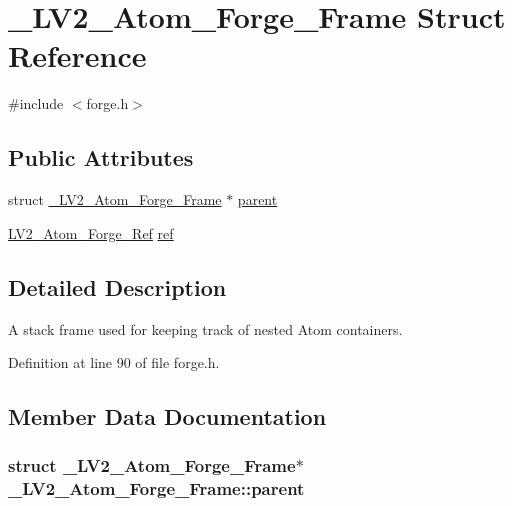 \hypertarget{struct___l_v2___atom___forge___frame}{}\section{\+\_\+\+L\+V2\+\_\+\+Atom\+\_\+\+Forge\+\_\+\+Frame Struct Reference}
\label{struct___l_v2___atom___forge___frame}


{\ttfamily \#include $<$forge.\+h$>$}

\subsection*{Public Attributes}
\begin{DoxyCompactItemize}
\item 
struct \hyperlink{struct___l_v2___atom___forge___frame}{\+\_\+\+L\+V2\+\_\+\+Atom\+\_\+\+Forge\+\_\+\+Frame} $\ast$ \hyperlink{struct___l_v2___atom___forge___frame_a35d90dd9d8f32700e3e69bb84aade946}{parent}
\item 
\hyperlink{forge_8h_a272218ba2d84c66ec458cf7069933ea9}{L\+V2\+\_\+\+Atom\+\_\+\+Forge\+\_\+\+Ref} \hyperlink{struct___l_v2___atom___forge___frame_ae4d7dc1067426985649b99b871841a01}{ref}
\end{DoxyCompactItemize}


\subsection{Detailed Description}
A stack frame used for keeping track of nested Atom containers. 

Definition at line 90 of file forge.\+h.



\subsection{Member Data Documentation}
\subsubsection[{\texorpdfstring{parent}{parent}}]{\setlength{\rightskip}{0pt plus 5cm}struct {\bf \+\_\+\+L\+V2\+\_\+\+Atom\+\_\+\+Forge\+\_\+\+Frame}$\ast$ \+\_\+\+L\+V2\+\_\+\+Atom\+\_\+\+Forge\+\_\+\+Frame\+::parent}\hypertarget{struct___l_v2___atom___forge___frame_a35d90dd9d8f32700e3e69bb84aade946}{}\label{struct___l_v2___atom___forge___frame_a35d90dd9d8f32700e3e69bb84aade946}


